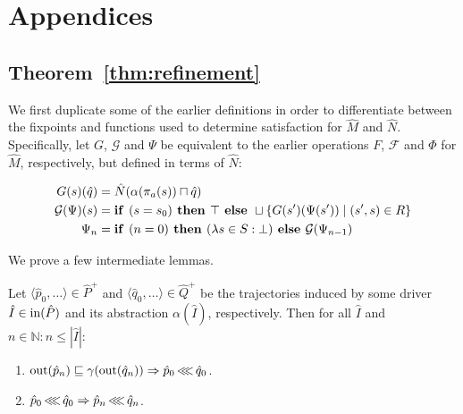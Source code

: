 \section{Appendices}

\subsection{Theorem~\ref{thm:refinement}}

We first duplicate some of the earlier definitions in order to differentiate between the fixpoints and functions used to determine satisfaction for $\hat M$ and $\hat N$. Specifically, let $G$, $\mathcal{G}$ and $\Psi$ be equivalent to the earlier operations $F$, $\mathcal{F}$ and $\Phi$ for $\hat M$, respectively, but defined in terms of $\hat N$:

\begin{align*}
G(s)(\hat q) &= \hat N(\alpha(\pi_{a}(s)) \sqcap \hat q) \\
\mathcal{G}(\Psi)(s) &= \textrm{\textbf{if }} (s = s_{0}) \textrm{\textbf{ then }} \top \textrm{\textbf{ else }} \sqcup \{ G(s')(\Psi(s')) \mid (s',s) \in R \} \\
\Psi_{n} &= \textrm{\textbf{if }} (n = 0) \textrm{\textbf{ then }} (\lambda s \in S : \bot) \textrm{\textbf{ else }} \mathcal{G}(\Psi_{n-1}) \\
\end{align*}



We prove a few intermediate lemmas.

\begin{lemma}
Let $\langle \hat p_{0}, \ldots \rangle \in \hat P^{+}$ and $\langle \hat q_{0}, \ldots \rangle \in \hat Q^{+}$ be the trajectories induced by some driver $\hat I \in \operatorname{in}(\hat P)$ and its abstraction $\alpha(\hat I)$, respectively. Then for all $\hat I$ and $n \in \mathbb{N} : n \leq | \hat I |$:
\begin{enumerate}
  \item $\operatorname{out}(\hat p_{n}) \sqsubseteq \gamma(\operatorname{out}(\hat q_{n})) \Rightarrow \hat p_{0} \operatorname{\lll} \hat q_{0}$.
  \item $\hat p_{0} \operatorname{\lll} \hat q_{0} \Rightarrow \hat p_{n} \operatorname{\lll} \hat q_{n}$.
\end{enumerate}
\end{lemma}


